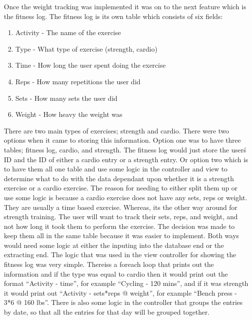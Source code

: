 Once the weight tracking was implemented it was on to the next feature which is the fitness log. The fitness log is its own table which consists of six fields:

\begin{enumerate}
\item Activity - The name of the exercise
\item Type - What type of exercise (strength, cardio)
\item Time - How long the user spent doing the exercise
\item Reps - How many repetitions the user did
\item Sets - How many sets the user did
\item Weight - How heavy the weight was
\end{enumerate}

There are two main types of exercises; strength and cardio. There were two options when it came to storing this information. Option one was to have three tables; fitness log, cardio, and strength. The fitness log would just store the user\'s ID and the ID of either a cardio entry or a strength entry. Or option two which is to have them all one table and use some logic in the controller and view to determine what to do with the data dependant upon whether it is a strength exercise or a cardio exercise. The reason for needing to either split them up or use some logic is because a cardio exercise does not have any sets, reps or weight. They are usually a time based exercise. Whereas, its the other way around for strength training. The user will want to track their sets, reps, and weight, and not how long it took them to perform the exercise. The decision was made to keep them all in the same table because it was easier to implement. Both ways would need some logic at either the inputing into the database end or the extracting end. The logic that was used in the view controller for showing the fitness log was very simple. Thereiss a foreach loop that prints out the information and if the type was equal to cardio then it would print out the format ``Activity - time'', for example ``Cycling - 120 mins'', and if it was strength it would print out ``Activity - sets*reps @ weight'', for example ``Bench press - 3*6 @ 160 lbs''. There is also some logic in the controller that groups the entries by date, so that all the entries for that day will be grouped together.\\

